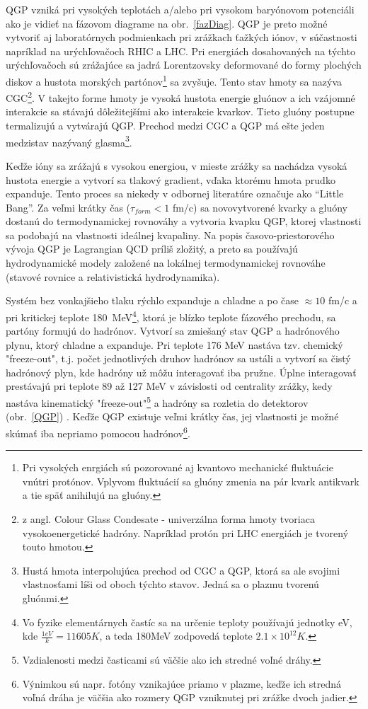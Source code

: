\documentclass[thesismargins, thesislinespacing]{rnthesis}
\begin{document}
QGP vzniká pri vysokých teplotách a/alebo pri vysokom baryónovom potenciáli ako je vidieť na fázovom diagrame na obr.~\ref{fazDiag}. QGP je preto možné vytvoriť aj laboratórnych podmienkach pri zrážkach ťažkých iónov, v súčastnosti napríklad na urýchľovačoch RHIC a LHC. Pri energiách dosahovaných na týchto urýchľovačoch sú zrážajúce sa jadrá Lorentzovsky deformované do formy plochých diskov a hustota morských partónov\footnote{Pri vysokých enrgiách sú pozorované aj kvantovo mechanické fluktuácie vnútri protónov. Vplyvom fluktuácií sa gluóny zmenia na pár kvark antikvark a tie späť anihilujú na gluóny.} sa zvyšuje. Tento stav hmoty sa nazýva CGC\footnote{z angl. Colour Glass Condesate - univerzálna forma hmoty tvoriaca vysokoenergetické hadróny\cite{hevion}. Napríklad protón pri LHC energiách je tvorený touto hmotou.}. V takejto forme hmoty je vysoká hustota energie gluónov a ich vzájomné interakcie sa stávajú dôležitejšími ako interakcie kvarkov. Tieto gluóny postupne termalizujú a vytvárajú QGP. Prechod medzi CGC a QGP má ešte jeden medzistav nazývaný glasma\footnote{Hustá hmota interpolujúca prechod od CGC a QGP, ktorá sa ale svojimi vlastnosťami líši od oboch týchto stavov\cite{hevion}. Jedná sa o plazmu tvorenú gluónmi.}\cite{glasma}.

Keďže ióny sa zrážajú s vysokou energiou, v mieste zrážky sa nachádza vysoká hustota energie a vytvorí sa tlakový gradient, vďaka ktorému hmota prudko expanduje. Tento proces sa niekedy v odbornej literatúre označuje ako “Little Bang”. Za veľmi krátky čas ($\tau_{form}<1$ fm/c)  sa novovytvorené kvarky a gluóny dostanú do termodynamickej rovnováhy a vytvoria kvapku QGP, ktorej vlastnosti sa podobajú na vlastnosti ideálnej kvapaliny. Na popis časovo-priestorového vývoja QGP je Lagrangian QCD príliš zložitý, a preto sa používajú hydrodynamické modely založené na lokálnej termodynamickej rovnováhe (stavové rovnice a relativistická hydrodynamika).

Systém bez vonkajšieho tlaku rýchlo expanduje a chladne a po čase $\approx 10$ fm/c a pri kritickej teplote 180~MeV\footnote{Vo fyzike elementárnych častíc sa na určenie teploty používajú jednotky eV, kde $\frac{1eV}{k}= 11605K$, a teda 180MeV zodpovedá teplote $2.1\times10^{12}K$.}, ktorá je blízko teplote fázového prechodu, sa partóny formujú do hadrónov. Vytvorí sa zmiešaný stav QGP a hadrónového plynu, ktorý chladne a expanduje.  Pri teplote 176 MeV\cite{tempr} nastáva tzv. chemický "freeze-out\-", t.j. počet jednotlivých druhov hadrónov sa ustáli a vytvorí sa čistý hadrónový plyn, kde hadróny už môžu interagovať iba pružne. Úplne interagovať prestávajú pri teplote 89 až 127 MeV v závislosti od centrality zrážky\cite{kinfrezze}, kedy nastáva kinematický "freeze-out"\footnote{Vzdialenosti medzi časticami sú väčšie ako ich stredné voľné dráhy. } \-a hadróny sa rozletia do detektorov (obr.~\ref{QGP}) . Keďže QGP existuje veľmi krátky čas, jej vlastnosti je možné skúmať iba nepriamo pomocou hadrónov\footnote{Výnimkou sú napr. fotóny vznikajúce priamo v plazme, keďže ich stredná voľná dráha je väčšia ako rozmery QGP vzniknutej pri zrážke dvoch jadier.}.  
\end{document}

